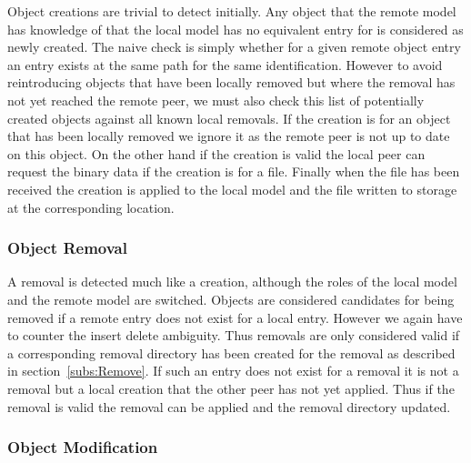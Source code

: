 Object creations are trivial to detect initially.
Any object that the remote model has knowledge of that the local model has no equivalent entry for is considered as newly created.
The naive check is simply whether for a given remote object entry an entry exists at the same path for the same identification.
However to avoid reintroducing objects that have been locally removed but where the removal has not yet reached the remote peer, we must also check this list of potentially created objects against all known local removals.
If the creation is for an object that has been locally removed we ignore it as the remote peer is not up to date on this object.
On the other hand if the creation is valid the local peer can request the binary data if the creation is for a file.
Finally when the file has been received the creation is applied to the local model and the file written to storage at the corresponding location.

\subsubsection{Object Removal}
\label{subs:Object Removal}

A removal is detected much like a creation, although the roles of the local model and the remote model are switched.
Objects are considered candidates for being removed if a remote entry does not exist for a local entry.
However we again have to counter the insert delete ambiguity.
Thus removals are only considered valid if a corresponding removal directory has been created for the removal as described in section~\ref{subs:Remove}.
If such an entry does not exist for a removal it is not a removal but a local creation that the other peer has not yet applied.
Thus if the removal is valid the removal can be applied and the removal directory updated.

\subsubsection{Object Modification}
\label{subs:Object Modification}

